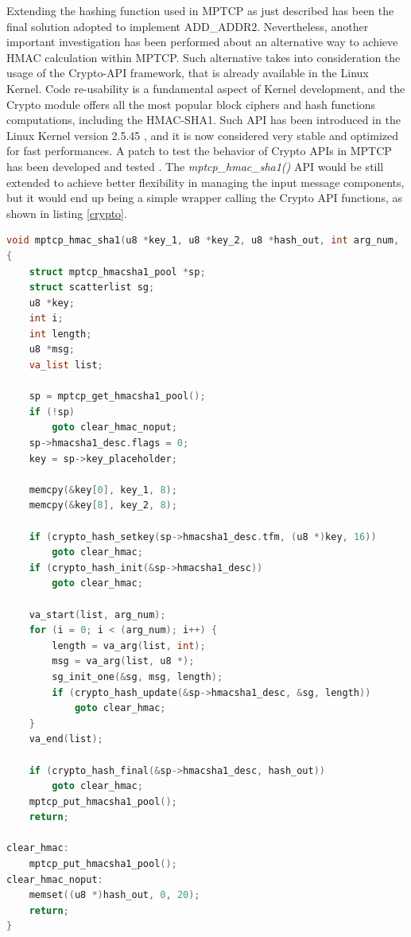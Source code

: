 Extending the hashing function used in MPTCP as just described has been the final solution adopted to implement ADD\_ADDR2. Nevertheless, another important investigation has been performed about an alternative way to achieve HMAC calculation within MPTCP. Such alternative takes into consideration the usage of the Crypto-API framework, that is already available in the Linux Kernel. Code re-usability is a fundamental aspect of Kernel development, and the Crypto module offers all the most popular block ciphers and hash functions computations, including the HMAC-SHA1. Such API has been introduced in the Linux Kernel version 2.5.45 \cite{cryptoinkernel}, and it is now considered very stable and optimized for fast performances. 
A patch to test the behavior of Crypto APIs in MPTCP has been developed and tested \cite{cryptopatch1} \cite{cryptopatch2}. The \textit{mptcp\_hmac\_sha1()} API would be still extended to achieve better flexibility in managing the input message components, but it would end up being a simple wrapper calling the Crypto API functions, as shown in listing \ref{crypto}.

\begin{lstlisting}[language=c, caption=\textit{\textit{mptcp\_hmac\_sha1() using Linux Kernel Crypto API}}, label=crypto]
void mptcp_hmac_sha1(u8 *key_1, u8 *key_2, u8 *hash_out, int arg_num, ...)
{
	struct mptcp_hmacsha1_pool *sp;
	struct scatterlist sg;
	u8 *key;
	int i;
	int length;
	u8 *msg;
	va_list list;

	sp = mptcp_get_hmacsha1_pool();
	if (!sp)
		goto clear_hmac_noput;
	sp->hmacsha1_desc.flags = 0;
	key = sp->key_placeholder;

	memcpy(&key[0], key_1, 8);
	memcpy(&key[8], key_2, 8);

	if (crypto_hash_setkey(sp->hmacsha1_desc.tfm, (u8 *)key, 16))
		goto clear_hmac;
	if (crypto_hash_init(&sp->hmacsha1_desc))
		goto clear_hmac;

	va_start(list, arg_num);
	for (i = 0; i < (arg_num); i++) {
		length = va_arg(list, int);
		msg = va_arg(list, u8 *);
		sg_init_one(&sg, msg, length);
		if (crypto_hash_update(&sp->hmacsha1_desc, &sg, length))
			goto clear_hmac;
	}
	va_end(list);

	if (crypto_hash_final(&sp->hmacsha1_desc, hash_out))
		goto clear_hmac;
	mptcp_put_hmacsha1_pool();
	return;

clear_hmac:
	mptcp_put_hmacsha1_pool();
clear_hmac_noput:
	memset((u8 *)hash_out, 0, 20);
	return;
}
\end{lstlisting}

